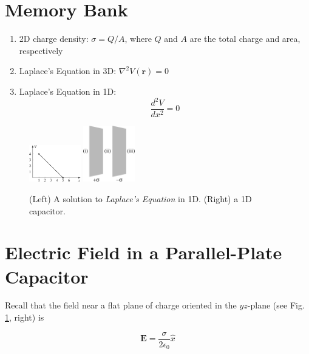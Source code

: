 \documentclass[12pt]{article}
\begin{document}
\maketitle

\section{Memory Bank}

\begin{enumerate}
\item 2D charge density: $\sigma = Q/A$, where $Q$ and $A$ are the total charge and area, respectively
\item Laplace's Equation in 3D: $\nabla^2 V(\mathbf{r}) = 0$
\item Laplace's Equation in 1D: 
\begin{equation}
\frac{d^2 V}{dx^2} = 0
\end{equation}
\end{enumerate}

\begin{figure}[ht]
\centering
\includegraphics[width=0.2\textwidth]{figures/3_1.jpg}
\includegraphics[width=0.2\textwidth]{figures/2_23.jpg}
\caption{\label{fig:f} (Left) A solution to \textit{Laplace's Equation} in 1D.  (Right) a 1D capacitor.}
\end{figure}

\section{Electric Field in a Parallel-Plate Capacitor}

Recall that the field near a flat plane of charge oriented in the $yz$-plane (see Fig. \ref{fig:f}, right) is 

\begin{equation}
\mathbf{E} = \frac{\sigma}{2\epsilon_0}\hat{x}
\end{equation}
\end{document}
